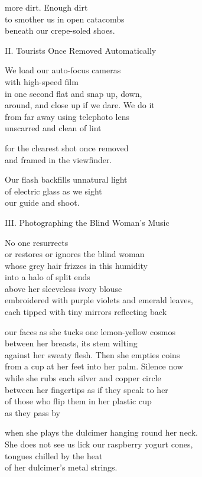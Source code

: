 \documentclass[twoside,10pt]{book}
\begin{document}
more dirt. Enough dirt\\
to smother us in open catacombs\\
beneath our crepe-soled shoes.

II.  Tourists Once Removed Automatically

We load our auto-focus cameras\\
with high-speed film\\
in one second flat and snap up, down,\\
around, and close up if we dare. We do it\\
from far away using telephoto lens\\
unscarred and clean of lint

for the clearest shot once removed\\
and framed in the viewfinder.

Our flash backfills unnatural light\\
of electric glass as we sight\\
our guide and shoot.

III. Photographing the Blind Woman's Music

No one resurrects\\
or restores or ignores the blind woman\\
whose grey hair frizzes in this humidity\\
into a halo of split ends\\
above her sleeveless ivory blouse\\
embroidered with purple violets and emerald leaves,\\
each tipped with tiny mirrors reflecting back

our faces as she tucks one lemon-yellow cosmos\\
between her breasts, its stem wilting\\
against her sweaty flesh. Then she empties coins\\
from a cup at her feet into her palm. Silence now\\
while she rubs each silver and copper circle\\
between her fingertips as if they speak to her\\
of those who flip them in her plastic cup\\
as they pass by

when she plays the dulcimer hanging round her neck.\\
She does not see us lick our raspberry yogurt cones,\\
tongues chilled by the heat\\
of her dulcimer's metal strings.
\end{document}
